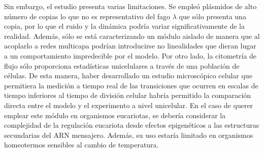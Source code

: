 \documentclass[nochap]{config/ejercicios}
\begin{document}

Sin embargo, el estudio presenta varias limitaciones. Se empleó plásmidos de alto número de copias lo que no es representativo del fago $\lambda$ que sólo presenta una copia, por lo que el ruido y la dinámica podría variar significativamente de la realidad. Además, sólo se está caracterizando un módulo aislado de manera que al acoplarlo a redes multicapa podrían introducirse no linealidades que dieran lugar a un comportamiento impredecible por el modelo. Por otro lado, la citometría de flujo sólo proporciona estadísticas unicelulares a través de una población de células. De esta manera, haber desarrollado un estudio microscópico celular que permitiera la medición a tiempo real de las transiciones que ocurren en escalas de tiempo inferiores al tiempo de división celular habría permitido la comparación directa entre el modelo y el experimento a nivel unicelular. En el caso de querer emplear este módulo en organismos eucariotas, se debería considerar la complejidad de la regulación eucariota desde efectos epigenéticos a las estructuras secundarias del ARN mensajero. Además, su uso estaría limitado en organismos homeotermos sensibles al cambio de temperatura.
\end{document}
